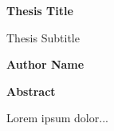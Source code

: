 \thispagestyle{plain}
\begin{center}
    \Large
    \textbf{Thesis Title}
    
    \vspace{0.4cm}
    \large
    Thesis Subtitle
    
    \vspace{0.4cm}
    \textbf{Author Name}
    
    \vspace{0.9cm}
    \textbf{Abstract}
\end{center}
Lorem ipsum dolor...